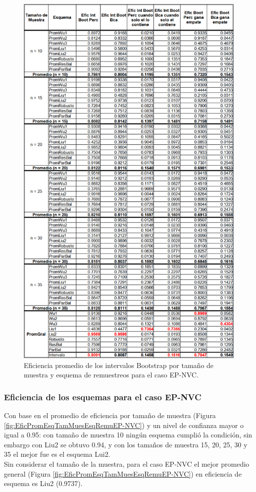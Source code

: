 \begin{figure}[H] 
	\centering 
	\includegraphics[width=0.55\linewidth]{img/EP_NVC_Efic_Boots.png} 
	\caption{Eficiencia promedio de los intervalos Bootstrap por tamaño de muestra y esquema de remuestreos para el caso EP-NVC.} 
	\label{fig:EficPromIntBootsTamMuestEsqRemuEP-NVC}
\end{figure}

\FloatBarrier

\subsubsection{Eficiencia de los esquemas para el caso EP-NVC}
Con base en el promedio de eficiencia por tamaño de muestra (Figura \ref{fig:EficPromEsqTamMuesEsqRemuEP-NVC}) y un nivel de confianza mayor o igual a 0.95: con tamaño de muestra 10 ningún esquema cumplió la condición, sin embargo con Liu2 se obtuvo 0.94, y con los tamaños de muestra 15, 20, 25, 30 y 35 el mejor fue es el esquema Lui2.\\


Sin considerar el tamaño de la muestra, para el caso EP-NVC el mejor promedio general (Figura \ref{fig:EficPromEsqTamMuesEsqRemuEP-NVC}) en eficiencia de esquema es Liu2 (0.9737).


